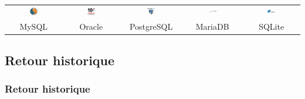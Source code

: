 \documentclass[svgnames,11pt]{beamer}
\begin{document}
\begin{frame}
    \frametitle{}

    \begin{center}
        \begin{tabular}{ccccc}
            \includegraphics[width=0.15\textwidth]{ressources/mysql.png} &
            \includegraphics[width=0.15\textwidth]{ressources/oracle.png} &
            \includegraphics[width=0.15\textwidth]{ressources/postgresql.png}
            &
            \includegraphics[width=0.15\textwidth]{ressources/maria.png}
            &
            \includegraphics[width=0.15\textwidth]{ressources/sqlite.png} \\
            MySQL &
            Oracle &
            PostgreSQL &
            MariaDB &
            SQLite
            \end{tabular}
    \end{center}

\end{frame}
\subsection{Retour historique}
\begin{frame}
    \frametitle{Retour historique}

    

\end{frame}
\end{document}
